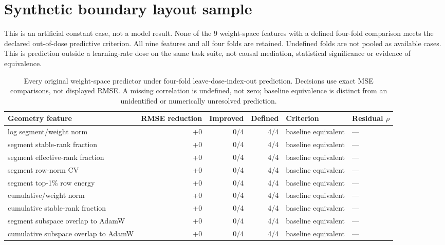 \documentclass[11pt]{article}
\newcommand{\CorrectedGeometryBridgeFinding}{None of the 9 weight-space features with a defined four-fold comparison meets the declared out-of-dose predictive criterion. All nine features and all four folds are retained. Undefined folds are not pooled as available cases. This is prediction outside a learning-rate dose on the same task suite, not causal mediation, statistical significance or evidence of equivalence.}
\newcommand{\CorrectedGeometryBridgeTable}{%
\begin{table}[t]
\centering\small
\begin{tabular}{lrrrll}\toprule
Geometry feature & RMSE reduction & Improved & Defined & Criterion & Residual $\rho$ \\
\midrule
log segment/weight norm & +0 & 0/4 & 4/4 & baseline equivalent & --- \\
segment stable-rank fraction & +0 & 0/4 & 4/4 & baseline equivalent & --- \\
segment effective-rank fraction & +0 & 0/4 & 4/4 & baseline equivalent & --- \\
segment row-norm CV & +0 & 0/4 & 4/4 & baseline equivalent & --- \\
segment top-1\% row energy & +0 & 0/4 & 4/4 & baseline equivalent & --- \\
cumulative/weight norm & +0 & 0/4 & 4/4 & baseline equivalent & --- \\
cumulative stable-rank fraction & +0 & 0/4 & 4/4 & baseline equivalent & --- \\
segment subspace overlap to AdamW & +0 & 0/4 & 4/4 & baseline equivalent & --- \\
cumulative subspace overlap to AdamW & +0 & 0/4 & 4/4 & baseline equivalent & --- \\
\bottomrule\end{tabular}
\caption{Every original weight-space predictor under four-fold leave-dose-index-out prediction. Decisions use exact MSE comparisons, not displayed RMSE. A missing correlation is undefined, not zero; baseline equivalence is distinct from an unidentified or numerically unresolved prediction.}
\label{tab:corrected-bridge}
\end{table}%
}
\begin{document}
\section*{Synthetic boundary layout sample}
This is an artificial constant case, not a model result.
\CorrectedGeometryBridgeFinding
\CorrectedGeometryBridgeTable
\end{document}
